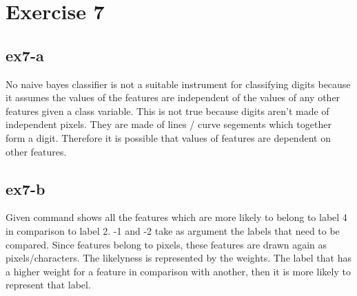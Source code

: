 \section{Exercise 7}
\subsection{ex7-a}
No naive bayes classifier is not a suitable instrument for classifying digits because it assumes the values of the
features are independent of the values of any other features given a class variable. This is not true because digits
aren't made of independent pixels. They are made of lines / curve segements which together form a digit. Therefore it
is possible that values of features are dependent on other features.

\subsection{ex7-b}
Given command shows all the features which are more likely to belong to label 4 in comparison to label 2. -1 and -2 take
as argument the labels that need to be compared. Since features belong to pixels, these features are drawn again as
pixels/characters. The likelyness is represented by the weights. The label that has a higher weight for a feature in
comparison with another, then it is more likely to represent that label.

